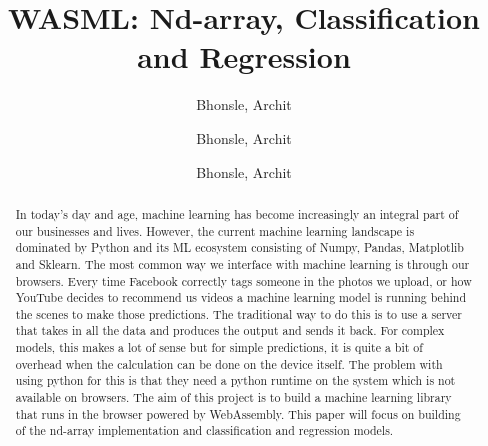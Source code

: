 \documentclass[a4paper,12pt]{report}
\title{WASML: Nd-array, Classification and Regression}
\author{
  Bhonsle, Archit\\
  \and
  Bhonsle, Archit\\
  \and
  Bhonsle, Archit\\
}
\begin{document}
\maketitle
\tableofcontents

\begin{abstract}
  In today’s day and age, machine learning has become increasingly an
  integral part of our businesses and lives. However, the current machine
  learning landscape is dominated by Python and its ML ecosystem consisting
  of Numpy, Pandas, Matplotlib and Sklearn. The most common way we
  interface with machine learning is through our browsers. Every time
  Facebook correctly tags someone in the photos we upload, or how YouTube
  decides to recommend us videos a machine learning model is running behind
  the scenes to make those predictions. The traditional way to do this is
  to use a server that takes in all the data and produces the output and
  sends it back. For complex models, this makes a lot of sense but for
  simple predictions, it is quite a bit of overhead when the calculation
  can be done on the device itself. The problem with using python for this
  is that they need a python runtime on the system which is not available
  on browsers. The aim of this project is to build a machine learning
  library that runs in the browser powered by WebAssembly. This paper will
  focus on building of the nd-array implementation and classification and
  regression models.
\end{abstract}
\end{document}
